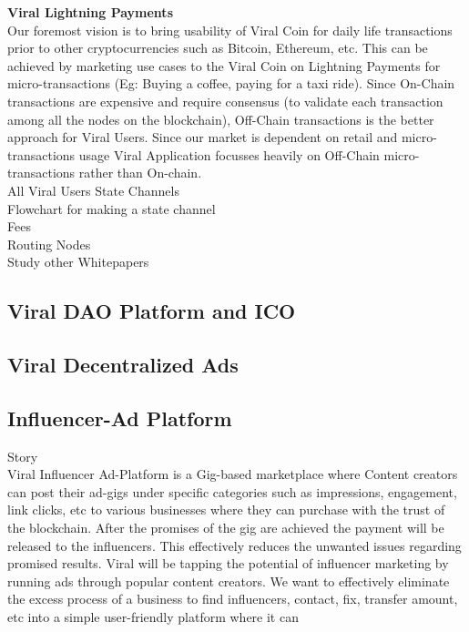 \documentclass[10pt]{article}
\begin{document}
\textbf{Viral Lightning Payments}\\

Our foremost vision is to bring usability of Viral Coin for daily life transactions prior to other cryptocurrencies such as Bitcoin, Ethereum, etc. This can be achieved by marketing use cases to the Viral Coin on Lightning Payments for micro-transactions  (Eg: Buying a coffee, paying for a taxi ride). Since On-Chain transactions are expensive and require consensus (to validate each transaction among all the nodes on the blockchain), Off-Chain transactions is the better approach for Viral Users. Since our market is dependent on retail and micro-transactions usage Viral Application focusses heavily on Off-Chain micro-transactions rather than On-chain.\\

All Viral Users State Channels\\
Flowchart for making a state channel\\
Fees\\
Routing Nodes\\
Study other Whitepapers\\

\subsection{Viral DAO Platform and ICO}

\subsection{Viral Decentralized Ads}

\subsection{Influencer-Ad Platform}

Story\\

Viral Influencer Ad-Platform is a Gig-based marketplace where Content creators can post their ad-gigs under specific categories such as impressions, engagement, link clicks, etc to various businesses where they can purchase with the trust of the blockchain. After the promises of the gig are achieved the payment will be released to the influencers. This effectively reduces the unwanted issues regarding promised results. Viral will be tapping the potential of influencer marketing by running ads through popular content creators. We want to effectively eliminate the excess process of a business to find influencers, contact, fix, transfer amount, etc into a simple user-friendly platform where it can\\
\end{document}
